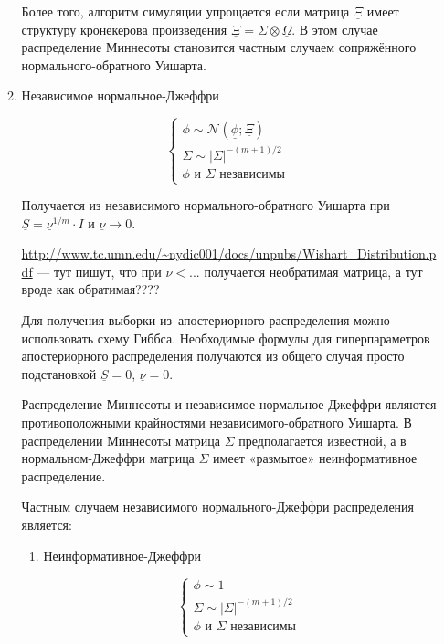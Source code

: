 \documentclass[11pt]{article} %
\newcommand{\cN}{\mathcal{N}}
\newcommand{\prior}{\underline}
\begin{document}
\begin{enumerate}
\begin{enumerate}
Более того, алгоритм симуляции упрощается если матрица $\prior \Xi$
имеет структуру кронекерова произведения $\prior \Xi =  \Sigma \otimes
\prior \Omega $. В этом случае распределение Миннесоты становится
частным случаем сопряжённого нормального-обратного Уишарта.



\item Независимое нормальное-Джеффри


\begin{equation}
\begin{cases}
\phi \sim \cN(\prior\phi; \prior\Xi ) \\
\Sigma \sim |\Sigma|^{-(m+1)/2} \\
\phi \text{ и } \Sigma \text{ независимы }
\end{cases}
\end{equation}




Получается из независимого нормального-обратного Уишарта при $\prior S
= \prior \nu^{1/m}\cdot I$ и  $\prior \nu \to 0$.



\url{http://www.tc.umn.edu/~nydic001/docs/unpubs/Wishart_Distribution.pdf}
--- тут пишут, что при $\nu <...$ получается необратимая матрица, а
тут вроде как обратимая????



Для получения выборки из~апостериорного распределения можно
использовать схему Гиббса. Необходимые формулы для гиперпараметров
апостериорного распределения получаются из общего случая просто
подстановкой $\prior S=0$, $\prior \nu =0$.



Распределение Миннесоты и независимое нормальное-Джеффри являются
противоположными крайностями независимого-обратного Уишарта. В
распределении Миннесоты матрица $\Sigma$ предполагается известной, а в
нормальном-Джеффри матрица $\Sigma$ имеет «размытое» неинформативное
распределение.



Частным случаем независимого нормального-Джеффри распределения является:


\begin{enumerate}

\item Неинформативное-Джеффри

\begin{equation}
\begin{cases}
\phi \sim 1 \\
\Sigma \sim |\Sigma|^{-(m+1)/2} \\
\phi \text{ и } \Sigma \text{ независимы }
\end{cases}
\end{equation}


\end{enumerate}
\end{enumerate}
\end{enumerate}
\end{document}
